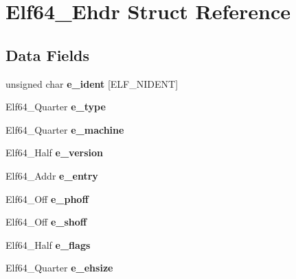 \hypertarget{structElf64__Ehdr}{}\section{Elf64\+\_\+\+Ehdr Struct Reference}
\label{structElf64__Ehdr}
\subsection*{Data Fields}
\begin{DoxyCompactItemize}
\item 
\mbox{\label{structElf64__Ehdr_ad52c7b12910cd4abd3b678b252a5b048}} 
unsigned char {\bfseries e\+\_\+ident} \mbox{[}E\+L\+F\+\_\+\+N\+I\+D\+E\+NT\mbox{]}
\item 
\mbox{\label{structElf64__Ehdr_aa9025130f56573621f6077a20c3568bf}} 
Elf64\+\_\+\+Quarter {\bfseries e\+\_\+type}
\item 
\mbox{\label{structElf64__Ehdr_adf3b0501b2e56f5c3f6deb89caa09eaa}} 
Elf64\+\_\+\+Quarter {\bfseries e\+\_\+machine}
\item 
\mbox{\label{structElf64__Ehdr_a05db1816a6628b83b9885bd19873dc2b}} 
Elf64\+\_\+\+Half {\bfseries e\+\_\+version}
\item 
\mbox{\label{structElf64__Ehdr_a943c7d038a3cc3c1115e84b4cd19966d}} 
Elf64\+\_\+\+Addr {\bfseries e\+\_\+entry}
\item 
\mbox{\label{structElf64__Ehdr_adc7d13d5c0e0eb4b62f0f898f03b2e66}} 
Elf64\+\_\+\+Off {\bfseries e\+\_\+phoff}
\item 
\mbox{\label{structElf64__Ehdr_a63fca3f9b273e5fd4d190d9cb7fba9b0}} 
Elf64\+\_\+\+Off {\bfseries e\+\_\+shoff}
\item 
\mbox{\label{structElf64__Ehdr_a1437d065a2f66ea2dd7a5e2899e1fb2d}} 
Elf64\+\_\+\+Half {\bfseries e\+\_\+flags}
\item 
\mbox{\label{structElf64__Ehdr_af88ca730d3e1fe5bef29920b70e93808}} 
Elf64\+\_\+\+Quarter {\bfseries e\+\_\+ehsize}

\end{DoxyCompactItemize}
